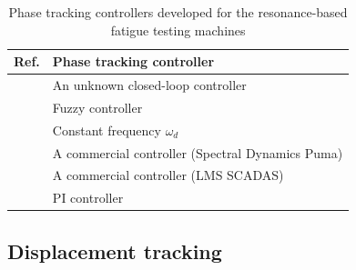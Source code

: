 \documentclass[lettersize,journal]{IEEEtran}
\begin{document}
\begin{table}
    \centering
    \begin{tabular}{|l|l|} \hline
     Ref.    &  Phase tracking controller  \\ \hline
    \cite{George_2006}  &  An unknown closed-loop controller \\  \hline
      \cite{Ji_2010}   &  Fuzzy controller  \\ \hline
    \cite{SCHRAMM2024117045,SCHNEIDER2018171,herrmann2018simulation_Thesis}  &  Constant frequency $\omega_d$ \\ \hline
    \cite{Su2014} & A commercial controller (Spectral Dynamics Puma) \\ \hline
    \cite{Dupke2026} & A commercial controller (LMS SCADAS) \\ \hline
    \cite{DORANGA2024115368} & PI controller \\
    \hline
    \end{tabular}
    \vspace{0.1cm}
    \caption{Phase tracking controllers developed for the resonance-based fatigue testing machines}
    \label{T_frequency_seeking}
\end{table}


\subsection{Displacement tracking} \label{S_amplitude_tracking}
\end{document}
